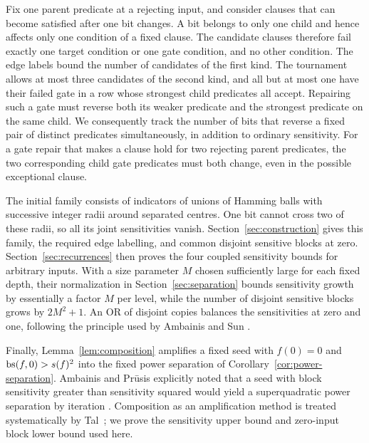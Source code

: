 Fix one parent predicate at a rejecting input, and consider clauses that
can become satisfied after one bit changes. A bit belongs to only one child
and hence affects only one condition of a fixed clause. The candidate
clauses therefore fail exactly one target condition or one gate condition,
and no other condition. The edge labels bound the number of candidates of
the first kind. The tournament allows at most three candidates of the
second kind, and all but at most one have their failed gate in a row whose
strongest child predicates all accept. Repairing such a gate must reverse
both its weaker predicate and the strongest predicate on the same child.
We consequently track the number of bits that reverse a fixed pair of
distinct predicates simultaneously, in addition to ordinary sensitivity.
For a gate repair that makes a clause hold for two rejecting parent
predicates, the two corresponding child gate predicates must both change,
even in the possible exceptional clause.

The initial family consists of indicators of unions of Hamming balls
with successive integer radii around separated centres. One bit cannot
cross two of these radii, so all its joint sensitivities vanish.
Section~\ref{sec:construction} gives this family, the required edge
labelling, and common disjoint sensitive blocks at zero.
Section~\ref{sec:recurrences} then proves the four coupled sensitivity
bounds for arbitrary inputs. With a size parameter \(M\) chosen
sufficiently large for each fixed depth, their normalization in
Section~\ref{sec:separation} bounds sensitivity growth by essentially
a factor \(M\) per level, while the number of disjoint sensitive blocks
grows by \(2M^2+1\). An OR of disjoint copies balances the sensitivities
at zero and one, following the principle used by Ambainis and Sun
\cite[Section~4, Lemma~1]{AmbainisSun2011}.

Finally, Lemma~\ref{lem:composition} amplifies a fixed seed with
\(f(0)=0\) and \(\operatorname{bs}(f,0)>s(f)^2\) into the fixed power separation of
Corollary~\ref{cor:power-separation}. Ambainis and Pr\={u}sis explicitly
noted that a seed with block sensitivity greater than sensitivity squared
would yield a superquadratic power separation by iteration
\cite[Section~1]{AmbainisPrusis2014}. Composition as an amplification method
is treated systematically by Tal~\cite{Tal2013}; we prove the sensitivity
upper bound and zero-input block lower bound used here.

